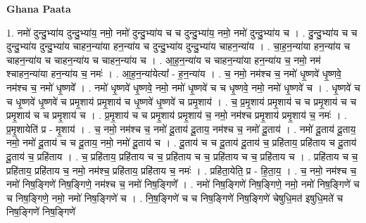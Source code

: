 \documentclass[17pt]{extarticle}
\begin{document}
\textbf{Ghana Paata } \newline

1. नमो॑ दुन्दु॒भ्या॑य दुन्दु॒भ्या॑य॒ नमो॒ नमो॑ दुन्दु॒भ्या॑य च च दुन्दु॒भ्या॑य॒ नमो॒ नमो॑ दुन्दु॒भ्या॑य च । . दु॒न्दु॒भ्या॑य च च दुन्दु॒भ्या॑य दुन्दु॒भ्या॑य चाहन॒न्या॑या हन॒न्या॑य च दुन्दु॒भ्या॑य दुन्दु॒भ्या॑य चाहन॒न्या॑य । . चा॒ह॒न॒न्या॑या हन॒न्या॑य च चाहन॒न्या॑य च चाहन॒न्या॑य च चाहन॒न्या॑य च । . आ॒ह॒न॒न्या॑य च चाहन॒न्या॑या हन॒न्या॑य च॒ नमो॒ नम॑ श्चाहन॒न्या॑या हन॒न्या॑य च॒ नमः॑ । . आ॒ह॒न॒न्या॑येत्या᳚ - ह॒न॒न्या॑य । . च॒ नमो॒ नम॑श्च च॒ नमो॑ धृ॒ष्णवे॑ धृ॒ष्णवे॒ नम॑श्च च॒ नमो॑ धृ॒ष्णवे᳚ । . नमो॑ धृ॒ष्णवे॑ धृ॒ष्णवे॒ नमो॒ नमो॑ धृ॒ष्णवे॑ च च धृ॒ष्णवे॒ नमो॒ नमो॑ धृ॒ष्णवे॑ च । . धृ॒ष्णवे॑ च च धृ॒ष्णवे॑ धृ॒ष्णवे॑ च प्रमृ॒शाय॑ प्रमृ॒शाय॑ च धृ॒ष्णवे॑ धृ॒ष्णवे॑ च प्रमृ॒शाय॑ । . च॒ प्र॒मृ॒शाय॑ प्रमृ॒शाय॑ च च प्रमृ॒शाय॑ च च प्रमृ॒शाय॑ च च प्रमृ॒शाय॑ च । . प्र॒मृ॒शाय॑ च च प्रमृ॒शाय॑ प्रमृ॒शाय॑ च॒ नमो॒ नम॑श्च प्रमृ॒शाय॑ प्रमृ॒शाय॑ च॒ नमः॑ । . प्र॒मृ॒शायेति॑ प्र - मृ॒शाय॑ । . च॒ नमो॒ नम॑श्च च॒ नमो॑ दू॒ताय॑ दू॒ताय॒ नम॑श्च च॒ नमो॑ दू॒ताय॑ । . नमो॑ दू॒ताय॑ दू॒ताय॒ नमो॒ नमो॑ दू॒ताय॑ च च दू॒ताय॒ नमो॒ नमो॑ दू॒ताय॑ च । . दू॒ताय॑ च च दू॒ताय॑ दू॒ताय॑ च॒ प्रहि॑ताय॒ प्रहि॑ताय च दू॒ताय॑ दू॒ताय॑ च॒ प्रहि॑ताय । . च॒ प्रहि॑ताय॒ प्रहि॑ताय च च॒ प्रहि॑ताय च च॒ प्रहि॑ताय च च॒ प्रहि॑ताय च । . प्रहि॑ताय च च॒ प्रहि॑ताय॒ प्रहि॑ताय च॒ नमो॒ नम॑श्च॒ प्रहि॑ताय॒ प्रहि॑ताय च॒ नमः॑ । . प्रहि॑ता॒येति॒ प्र - हि॒ता॒य॒ । . च॒ नमो॒ नम॑श्च च॒ नमो॑ निष॒ङ्गिणे॑ निष॒ङ्गिणे॒ नम॑श्च च॒ नमो॑ निष॒ङ्गिणे᳚ । . नमो॑ निष॒ङ्गिणे॑ निष॒ङ्गिणे॒ नमो॒ नमो॑ निष॒ङ्गिणे॑ च च निष॒ङ्गिणे॒ नमो॒ नमो॑ निष॒ङ्गिणे॑ च । . नि॒ष॒ङ्गिणे॑ च च निष॒ङ्गिणे॑ निष॒ङ्गिणे॑ चेषुधि॒मत॑ इषुधि॒मते॑ च निष॒ङ्गिणे॑ निष॒ङ्गिणे॑ 
\end{document}

